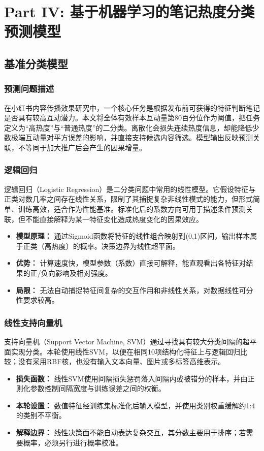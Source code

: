 \part{Part IV: 基于机器学习的笔记热度分类预测模型}

\chapter{基准分类模型}

\section{预测问题描述}
在小红书内容传播效果研究中，一个核心任务是根据发布前可获得的特征判断笔记是否具有较高互动潜力。本文将全体有效样本互动量第80百分位作为阈值，把任务定义为“高热度”与“普通热度”的二分类。离散化会损失连续热度信息，却能降低少数极端互动量对平方误差的影响，并直接支持候选内容筛选。模型输出反映预测关联，不等同于加大推广后会产生的因果增量。

\section{逻辑回归}
逻辑回归（Logistic Regression）是二分类问题中常用的线性模型。它假设特征与正类对数几率之间存在线性关系，限制了其捕捉复杂非线性模式的能力，但形式简单、训练高效，适合作为性能基准。标准化后的系数方向可用于描述条件预测关联，但不能直接解释为某一特征变化造成热度变化的因果效应。
\begin{itemize}
	\item \textbf{模型原理：} 通过Sigmoid函数将特征的线性组合映射到(0,1)区间，输出样本属于正类（高热度）的概率。决策边界为线性超平面。
	\item \textbf{优势：} 计算速度快，模型参数（系数）直接可解释，能直观看出各特征对结果的正/负向影响及相对强度。
	\item \textbf{局限：} 无法自动捕捉特征间复杂的交互作用和非线性关系，对数据线性可分性要求较高。
\end{itemize}

\section{线性支持向量机}
支持向量机（Support Vector Machine, SVM）通过寻找具有较大分类间隔的超平面实现分类。本轮使用线性SVM，以便在相同10项结构化特征上与逻辑回归比较；没有采用RBF核，也没有输入文本向量、图片或多标签高维表示。
\begin{itemize}
	\item \textbf{损失函数：} 线性SVM使用间隔损失惩罚落入间隔内或被错分的样本，并由正则化参数控制间隔宽度与训练误差之间的权衡。
	\item \textbf{本轮设置：} 数值特征经训练集标准化后输入模型，并使用类别权重缓解约1:4的类别不平衡。
	\item \textbf{解释边界：} 线性决策面不能自动表达复杂交互，其分数主要用于排序；若需要概率，必须另行进行概率校准。
\end{itemize}

